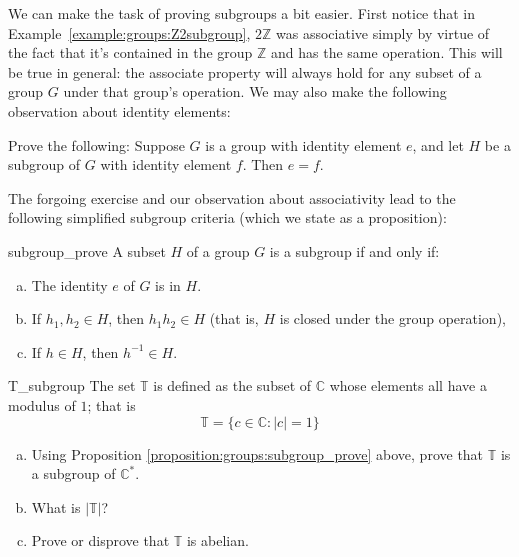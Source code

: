 We can make the task of proving subgroups  a bit easier. First notice that in Example~\ref{example:groups:Z2subgroup},  $2{\mathbb Z}$ was  associative simply by virtue of the fact that it's contained in the  group ${\mathbb Z}$ and has the same operation.  This will be true in general: the associate property will always hold for any subset of a group $G$ under that group's operation. We may also make the following observation about identity elements:

\begin{exercise}{65}
Prove the following: Suppose $G$ is a group with identity element $e$, and let $H$ be a subgroup of $G$ with identity element $f$.  Then $e=f$.
\end{exercise}

The forgoing exercise and our observation about associativity lead to the following simplified subgroup criteria (which we state as a proposition):

\begin{prop}{subgroup_prove}
A subset $H$ of a group $G$ is a subgroup if and only if: 
\begin{enumerate}[(a)]
 
 \item
The identity $e$ of $G$ is in $H$. 
 
\item
If $h_1, h_2 \in H$, then $h_1h_2 \in H$ (that is, $H$ is closed under the group operation), 
 
\item
If $h \in H$, then $h^{-1} \in H$.
 
\end{enumerate}
\end{prop}
 
\begin{exercise}{T_subgroup}
The set ${\mathbb T}$ is defined as the subset of  ${\mathbb C}$ whose elements all have a modulus of $1$; that is
\[
{\mathbb T} = \{c \in {\mathbb C} :  | c | =1 \} \]

\begin{enumerate}[(a)]
\item
Using Proposition \ref{proposition:groups:subgroup_prove} above, prove that ${\mathbb T}$ is a subgroup of ${\mathbb C}^{\ast}$.
\item
What is $| {\mathbb T} |$?
\item
Prove or disprove that ${\mathbb T}$ is abelian.
\end{enumerate}
\end{exercise}

